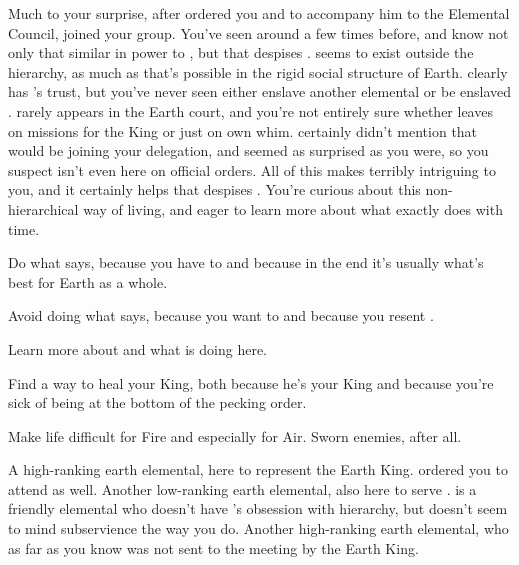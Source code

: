 \documentclass[char]{elementals}
\begin{document}
Much to your surprise, after \cLoyal{} ordered you and \cMinion{} to accompany him to the Elemental Council, \cRogue{\intro} joined your group.  You've seen \cRogue{\them} around a few times before, and know not only that  similar in power to \cLoyal{}, but that \cLoyal{} despises \cRogue{\them}.  \cRogue{} seems to exist outside the hierarchy, as much as that's possible in the rigid social structure of Earth.  \cRogue{\They} clearly has \cEarthKing{}'s trust, but you've never seen \cRogue{\them} either enslave another elemental or be enslaved \cRogue{\themself}.  \cRogue{} rarely appears in the Earth court, and you're not entirely sure whether \cRogue{\they} leaves on missions for the King or just on \cRogue{\their} own whim.  \cEarthKing{} certainly didn't mention that \cRogue{} would be joining your delegation, and \cLoyal{} seemed as surprised as you were, so you suspect \cRogue{} isn't even here on official orders.  All of this makes \cRogue{} terribly intriguing to you, and it certainly helps that \cLoyal{} despises \cRogue{\them}.  You're curious about this non-hierarchical way of living, and eager to learn more about what exactly \cRogue{} does with \cRogue{\their} time.

\begin{itemz}[Goals]
	\item  Do what \cLoyal{} says, because you have to and because in the end it's usually what's best for Earth as a whole.
	\item  Avoid doing what \cLoyal{} says, because you want to and because you resent \cLoyal{\them}.
	\item  Learn more about \cRogue{} and what \cRogue{\they} is doing here.
  \item  Find a way to heal your King, both because he's your King and because you're sick of being at the bottom of the pecking order.
	\item  Make life difficult for Fire and especially for Air.  Sworn enemies, after all.
\end{itemz}

\begin{contacts}
  \contact{\cLoyal{\intro}} A high-ranking earth elemental, here to represent the Earth King.  \cLoyal{\They} ordered you to attend as well.
	\contact{\cMinion{\intro}} Another low-ranking earth elemental, also here to serve \cLoyal{}.  \cMinion{} is a friendly elemental who doesn't have \cLoyal{}'s obsession with hierarchy, but doesn't seem to mind subservience the way you do.
	\contact{\cRogue{\intro}} Another high-ranking earth elemental, who as far as you know was not sent to the meeting by the Earth King.
\end{contacts} 
\end{document}
